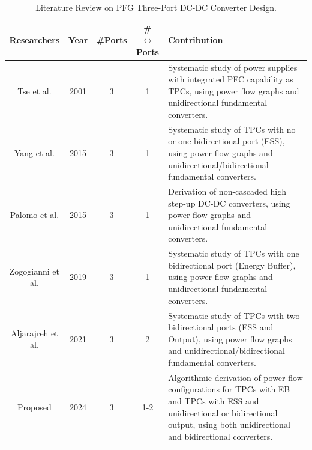 \documentclass[conference]{IEEEtran}
\begin{document}
\begin{table}
	\centering
	\caption{Literature Review on PFG Three-Port DC-DC Converter Design.}
\label{tab:summary}
\begin{tabularx}{\linewidth}{| c || c | c| c | X ||} 
         \hline
         \textbf{Researchers} & \textbf{Year} & \textbf{\#Ports} & \textbf{\# $\leftrightarrow$ Ports} & \textbf{Contribution}\\ [0.5ex] 
         \hline\hline 
         Tse et al. & 2001 & 3 & 1 &  Systematic study of power supplies with integrated PFC capability as TPCs, using power flow graphs and unidirectional fundamental converters.\\[0.5ex]
         \hline 
         Yang et al. & 2015 & 3 & 1 & Systematic study of TPCs with no or one bidirectional port (ESS), using power flow graphs and unidirectional/bidirectional fundamental converters.\\ [0.5ex]
         \hline 
         Palomo et al. & 2015 & 3 & 1 & Derivation of non-cascaded high step-up DC-DC converters, using power flow graphs and unidirectional fundamental converters.\\ [0.5ex]
         \hline
         Zogogianni et al. & 2019 & 3 & 1 & Systematic study of TPCs with one bidirectional port (Energy Buffer), using power flow graphs and unidirectional fundamental converters.\\[0.5ex]
         \hline 
         Aljarajreh et al. & 2021 & 3 & 2 & Systematic study of TPCs with two bidirectional ports (ESS and Output), using power flow graphs and unidirectional/bidirectional fundamental converters.\\ [0.5ex]
         \hline 
         Proposed & 2024 & 3 & 1-2 & Algorithmic derivation of power flow configurations for TPCs with EB and TPCs with ESS and unidirectional or bidirectional output, using both unidirectional and bidirectional converters.\\ [0.5ex]
         \hline
         \hline
\end{tabularx}
\end{table}
\end{document}
